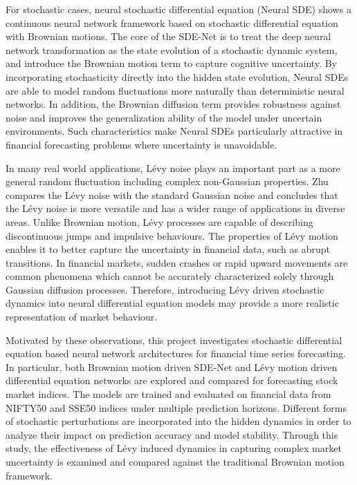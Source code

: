 For stochastic cases, neural stochastic differential equation (Neural SDE) \cite{liu2019neuralsdestabilizingneural} shows a continuous neural network framework based on stochastic differential equation with Brownian motions. The core of the SDE-Net is to treat the deep neural network transformation as the state evolution of a stochastic dynamic system, and introduce the Brownian motion term to capture cognitive uncertainty. By incorporating stochasticity directly into the hidden state evolution, Neural SDEs are able to model random fluctuations more naturally than deterministic neural networks. In addition, the Brownian diffusion term provides robustness against noise and improves the generalization ability of the model under uncertain environments. Such characteristics make Neural SDEs particularly attractive in financial forecasting problems where uncertainty is unavoidable.

In many real world applications, Lévy noise plays an important part as a more general random fluctuation including complex non-Gaussian properties. Zhu \cite{ZHU2014126} compares the Lévy noise with the standard Gaussian noise and concludes that the Lévy noise is more versatile and has a wider range of applications in diverse areas. Unlike Brownian motion, Lévy processes are capable of describing discontinuous jumps and impulsive behaviours. The properties of Lévy motion enables it to better capture the uncertainty in financial data, such as abrupt transitions. In financial markets, sudden crashes or rapid upward movements are common phenomena which cannot be accurately characterized solely through Gaussian diffusion processes. Therefore, introducing Lévy driven stochastic dynamics into neural differential equation models may provide a more realistic representation of market behaviour.

Motivated by these observations, this project investigates stochastic differential equation based neural network architectures for financial time series forecasting. In particular, both Brownian motion driven SDE-Net and Lévy motion driven differential equation networks are explored and compared for forecasting stock market indices. The models are trained and evaluated on financial data from NIFTY50 and SSE50 indices under multiple prediction horizons. Different forms of stochastic perturbations are incorporated into the hidden dynamics in order to analyze their impact on prediction accuracy and model stability. Through this study, the effectiveness of Lévy induced dynamics in capturing complex market uncertainty is examined and compared against the traditional Brownian motion framework.

